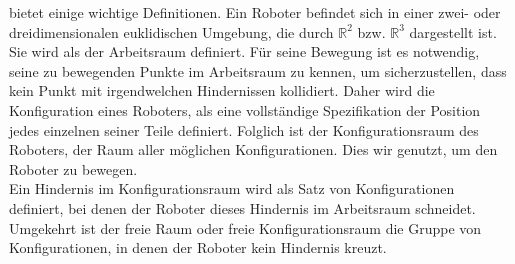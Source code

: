%
%
%
\cite{Principles:05} bietet einige wichtige Definitionen. Ein Roboter befindet sich in einer zwei- oder dreidimensionalen euklidischen Umgebung, die durch $\mathbb{R}^{2}$ bzw. $\mathbb{R}^{3}$ dargestellt ist. Sie wird als der Arbeitsraum definiert. Für seine Bewegung ist es notwendig, seine zu bewegenden Punkte im Arbeitsraum zu kennen, um sicherzustellen, dass kein Punkt mit irgendwelchen Hindernissen kollidiert. Daher wird die Konfiguration eines Roboters, als eine vollständige Spezifikation der Position jedes einzelnen seiner Teile definiert. Folglich ist der Konfigurationsraum des Roboters, der Raum aller  möglichen Konfigurationen. Dies wir genutzt, um den Roboter zu bewegen.\\
Ein Hindernis im Konfigurationsraum wird als Satz von Konfigurationen definiert, bei denen der Roboter dieses Hindernis im Arbeitsraum schneidet. Umgekehrt ist der freie Raum oder freie Konfigurationsraum die Gruppe von Konfigurationen, in denen der Roboter kein Hindernis kreuzt.


